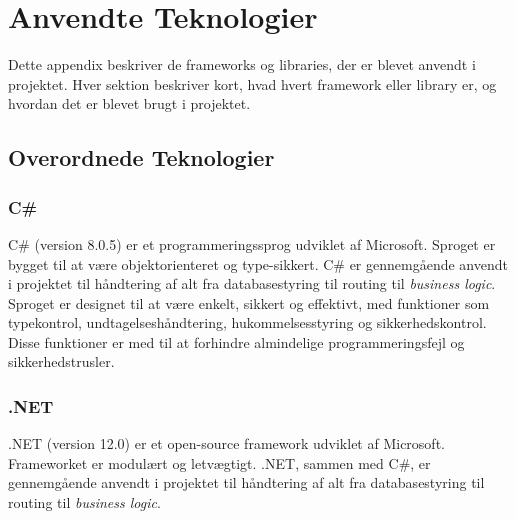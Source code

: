 \chapter{Anvendte Teknologier}
\label{appendix:anvendte-teknologier}
Dette appendix beskriver de frameworks og libraries, der er blevet anvendt i projektet. Hver sektion beskriver kort, hvad hvert framework eller library er, og hvordan det er blevet brugt i projektet.

\section{Overordnede Teknologier}
\subsection{C\#}
C\# (version 8.0.5) er et programmeringssprog udviklet af Microsoft. Sproget er bygget til at være objektorienteret og type-sikkert. C\# er gennemgående anvendt i projektet til håndtering af alt fra databasestyring til routing til \emph{business logic}. Sproget er designet til at være enkelt, sikkert og effektivt, med funktioner som typekontrol, undtagelseshåndtering, hukommelsesstyring og sikkerhedskontrol. Disse funktioner er med til at forhindre almindelige programmeringsfejl og sikkerhedstrusler.

\subsection{.NET}
.NET (version 12.0) er et open-source framework udviklet af Microsoft. Frameworket er modulært og letvægtigt. .NET, sammen med C\#, er gennemgående anvendt i projektet til håndtering af alt fra databasestyring til routing til \emph{business logic}.


